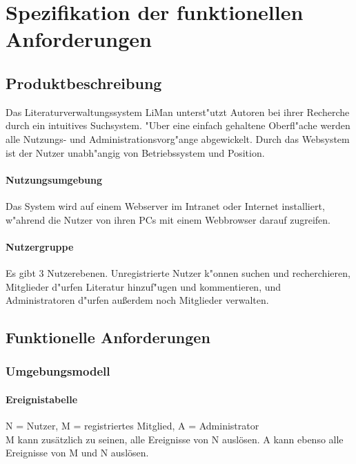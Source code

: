 \chapter{Spezifikation der funktionellen Anforderungen}
\section{Produktbeschreibung}
Das Literaturverwaltungssystem LiMan unterst"utzt Autoren bei
ihrer Recherche durch ein intuitives Suchsystem. "Uber eine einfach
gehaltene Oberfl"ache werden alle Nutzungs- und Administrationsvorg"ange
abgewickelt. Durch das Websystem ist der Nutzer unabh"angig von Betriebssystem 
und Position.
\subsubsection*{Nutzungsumgebung}
Das System wird auf einem Webserver im Intranet oder 
Internet installiert, w"ahrend die Nutzer von ihren PCs mit
einem Webbrowser darauf zugreifen.
\subsubsection*{Nutzergruppe}
Es gibt 3 Nutzerebenen. Unregistrierte Nutzer k"onnen suchen und recherchieren,
Mitglieder d"urfen Literatur hinzuf"ugen und kommentieren, und Administratoren
d"urfen außerdem noch Mitglieder verwalten.


\section{Funktionelle Anforderungen}
\subsection{Umgebungsmodell}

\subsubsection{Ereignistabelle}
N = Nutzer, M = registriertes Mitglied, A = Administrator \\
M kann zusätzlich zu seinen, alle Ereignisse von N auslösen. A kann ebenso alle Ereignisse von M und N auslösen.

